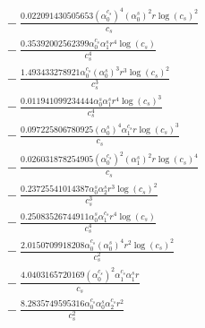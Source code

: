 \documentclass[10pt]{article}
\begin{document}
\begin{align*}
&{}  - \frac{0.022091430505653 \left(\alpha_{0}^{c_s}\right)^{4} \left(\alpha_{0}^s\right)^{2} r \log{\left(c_{s} \right)}^{2}}{c_{s}} \\
&{}  - \frac{0.35392002562399 \alpha_{0}^{c_s} \alpha_{1}^s r^{4} \log{\left(c_{s} \right)}}{c_{s}^{4}} \\
&{}  - \frac{1.493433278921 \alpha_{0}^{c_s} \left(\alpha_{0}^s\right)^{3} r^{3} \log{\left(c_{s} \right)}^{2}}{c_{s}^{3}} \\
&{}  - \frac{0.011941099234444 \alpha_{0}^s \alpha_{1}^s r^{4} \log{\left(c_{s} \right)}^{3}}{c_{s}^{4}} \\
&{}  - \frac{0.097225806780925 \left(\alpha_{0}^s\right)^{4} \alpha_{1}^{c_s} r \log{\left(c_{s} \right)}^{3}}{c_{s}} \\
&{}  - \frac{0.026031878254905 \left(\alpha_{0}^{c_s}\right)^{2} \left(\alpha_{1}^s\right)^{2} r \log{\left(c_{s} \right)}^{4}}{c_{s}} \\
&{}  - \frac{0.23725541014387 \alpha_{0}^s \alpha_{2}^s r^{3} \log{\left(c_{s} \right)}^{2}}{c_{s}^{3}} \\
&{}  - \frac{0.25083526744911 \alpha_{0}^s \alpha_{1}^{c_s} r^{4} \log{\left(c_{s} \right)}}{c_{s}^{4}} \\
&{}  - \frac{2.0150709918208 \alpha_{0}^{c_s} \left(\alpha_{0}^s\right)^{4} r^{2} \log{\left(c_{s} \right)}^{2}}{c_{s}^{2}} \\
&{}  - \frac{4.0403165720169 \left(\alpha_{0}^{c_s}\right)^{2} \alpha_{1}^{c_s} \alpha_{1}^s r}{c_{s}} \\
&{}  - \frac{8.2835749595316 \alpha_{0}^{c_s} \alpha_{0}^s \alpha_{2}^{c_s} r^{2}}{c_{s}^{2}}
\end{align*}
\end{document}
